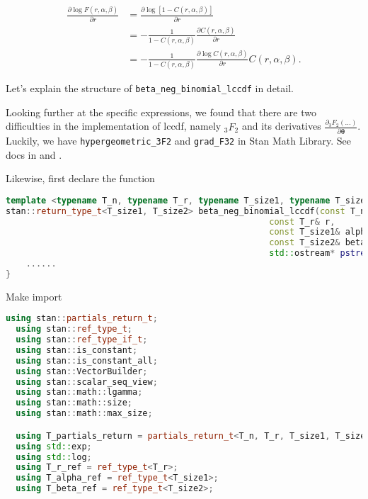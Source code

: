 \documentclass[11pt]{article}
\begin{document}
\begin{equation}
\begin{aligned}
	\frac{\partial \log F(r,\alpha,\beta)}{\partial r} &= \frac{\partial \log [1 - C(r,\alpha,\beta)]}{\partial r}\\
	 &= - \frac{1}{1 - C(r,\alpha,\beta)} \frac{\partial C(r,\alpha,\beta)}{\partial r} \\
	 &= - \frac{1}{1 - C(r,\alpha,\beta)} \frac{\partial \log C(r,\alpha,\beta)}{\partial r} C(r,\alpha,\beta).
\end{aligned}
\end{equation}

Let’s explain the structure of \verb|beta_neg_binomial_lccdf| in detail.

Looking further at the specific expressions, we found that there are two difficulties in the implementation of lccdf, namely ${}_3F_2$ and its derivatives $\frac{\partial {}_3F_2(...)}{\partial \boldsymbol{\theta}}$. Luckily, we have \verb|hypergeometric_3F2| and \verb|grad_F32| in Stan Math Library. See docs in  and .





Likewise, first declare the function
\begin{lstlisting}[language=c++, style=lgeneral]
template <typename T_n, typename T_r, typename T_size1, typename T_size2>
stan::return_type_t<T_size1, T_size2> beta_neg_binomial_lccdf(const T_n& n, 
                                                    const T_r& r,
                                                    const T_size1& alpha,
                                                    const T_size2& beta,
                                                    std::ostream* pstream__) {
	......
}
\end{lstlisting}

Make import
\begin{lstlisting}[language=c++, style=lgeneral]
  using stan::partials_return_t;
  using stan::ref_type_t;
  using stan::ref_type_if_t;
  using stan::is_constant;
  using stan::is_constant_all;
  using stan::VectorBuilder;
  using stan::scalar_seq_view;
  using stan::math::lgamma;
  using stan::math::size;
  using stan::math::max_size;

  using T_partials_return = partials_return_t<T_n, T_r, T_size1, T_size2>;
  using std::exp;
  using std::log;
  using T_r_ref = ref_type_t<T_r>;
  using T_alpha_ref = ref_type_t<T_size1>;
  using T_beta_ref = ref_type_t<T_size2>;
\end{lstlisting}
\end{document}
